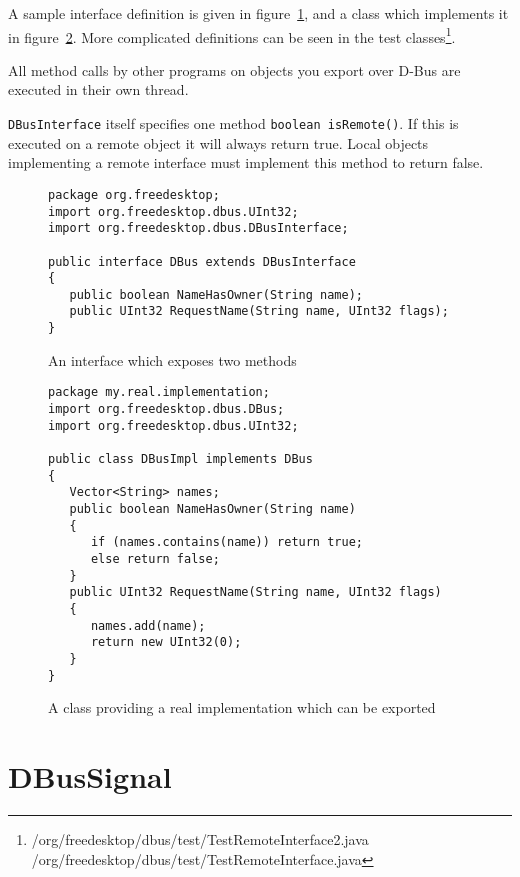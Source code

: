 \documentclass[a4paper,12pt]{article}
\begin{document}
A sample interface definition is given in figure~\ref{fig:interface}, and a
class which implements it in figure~\ref{fig:class}. More complicated
definitions can be seen in the test
classes\footnote{\javadocroot/org/freedesktop/dbus/test/TestRemoteInterface2.java
\javadocroot/org/freedesktop/dbus/test/TestRemoteInterface.java}.

All method calls by other programs on objects you export over D-Bus
are executed in their own thread.

{\tt DBusInterface} itself specifies one method \verb&boolean isRemote()&. If
this is executed on a remote object it will always return true. Local objects
implementing a remote interface must implement this method to return false.

\begin{figure}[htb]
\begin{center}
\begin{verbatim}
package org.freedesktop;
import org.freedesktop.dbus.UInt32;
import org.freedesktop.dbus.DBusInterface;

public interface DBus extends DBusInterface
{
   public boolean NameHasOwner(String name);
   public UInt32 RequestName(String name, UInt32 flags);
}
\end{verbatim}
\end{center}
\caption{An interface which exposes two methods}
\label{fig:interface}
\end{figure}

\begin{figure}[htb]
\begin{center}
\begin{verbatim}
package my.real.implementation;
import org.freedesktop.dbus.DBus;
import org.freedesktop.dbus.UInt32;

public class DBusImpl implements DBus
{
   Vector<String> names;
   public boolean NameHasOwner(String name)
   {
      if (names.contains(name)) return true;
      else return false;
   }
   public UInt32 RequestName(String name, UInt32 flags)
   {
      names.add(name);
      return new UInt32(0);
   }
}
\end{verbatim}
\end{center}
\caption{A class providing a real implementation which can be exported}
\label{fig:class}
\end{figure}

\section{DBusSignal}
\end{document}
